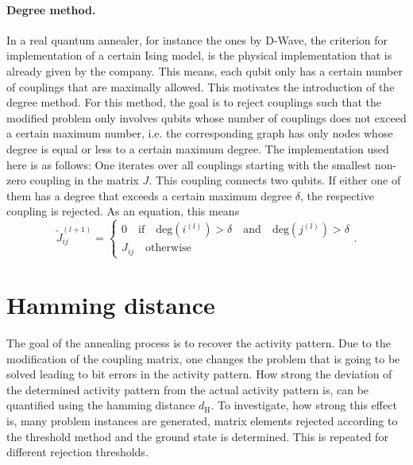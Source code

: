\documentclass{article}
\begin{document}
	\paragraph{Degree method.}In a real quantum annealer, for instance the ones by D-Wave, the criterion for implementation of a certain Ising model, is the physical implementation that is already given by the company. This means, each qubit only has a certain number of couplings that are maximally allowed. This motivates the introduction of the degree method. For this method, the goal is to reject couplings such that the modified problem only involves qubits whose number of couplings does not exceed a certain maximum number, i.e. the corresponding graph has only nodes whose degree is equal or less to a certain maximum degree. The implementation used here is as follows: One iterates over all couplings starting with the smallest non-zero coupling in the matrix $J$. This coupling connects two qubits. If either one of them has a degree that exceeds a certain maximum degree $\delta$, the respective coupling is rejected. As an equation, this means
	\begin{equation}
		\tilde{J}_{ij}^{(l+1)} = \begin{cases} 0 \quad\text{if}\quad \mathrm{deg}(i^{(l)})>\delta \quad \text{and}\quad \mathrm{deg}(j^{(l)})>\delta \\
			J_{ij} \quad\text{otherwise}
		\end{cases}.
	\end{equation}
	
	
	\section{Hamming distance}\label{sec:hamming distance}
	The goal of the annealing process is to recover the activity pattern. Due to the modification of the coupling matrix, one changes the problem that is going to be solved leading to bit errors in the activity pattern. How strong the deviation of the determined activity pattern from the actual activity pattern is, can be quantified using the hamming distance $d_\text{H}$.
	To investigate, how strong this effect is, many problem instances are generated, matrix elements rejected according to the threshold method and the ground state is determined. This is repeated for different rejection thresholds.
	 
\end{document}
